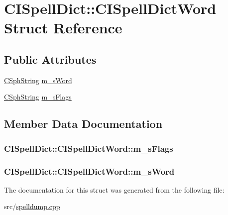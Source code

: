 \hypertarget{structCISpellDict_1_1CISpellDictWord}{\section{C\-I\-Spell\-Dict\-:\-:C\-I\-Spell\-Dict\-Word Struct Reference}
\label{structCISpellDict_1_1CISpellDictWord}
}
\subsection*{Public Attributes}
\begin{DoxyCompactItemize}
\item 
\hyperlink{structCSphString}{C\-Sph\-String} \hyperlink{structCISpellDict_1_1CISpellDictWord_ab806c3f868aa856d7e28c4ff5b277d90}{m\-\_\-s\-Word}
\item 
\hyperlink{structCSphString}{C\-Sph\-String} \hyperlink{structCISpellDict_1_1CISpellDictWord_ad62a81df24d587d5aa64d94a76a2cfe2}{m\-\_\-s\-Flags}
\end{DoxyCompactItemize}


\subsection{Member Data Documentation}
\hypertarget{structCISpellDict_1_1CISpellDictWord_ad62a81df24d587d5aa64d94a76a2cfe2}{
\subsubsection[{m\-\_\-s\-Flags}]{ C\-I\-Spell\-Dict\-::\-C\-I\-Spell\-Dict\-Word\-::m\-\_\-s\-Flags}}\label{structCISpellDict_1_1CISpellDictWord_ad62a81df24d587d5aa64d94a76a2cfe2}
\hypertarget{structCISpellDict_1_1CISpellDictWord_ab806c3f868aa856d7e28c4ff5b277d90}{
\subsubsection[{m\-\_\-s\-Word}]{ C\-I\-Spell\-Dict\-::\-C\-I\-Spell\-Dict\-Word\-::m\-\_\-s\-Word}}\label{structCISpellDict_1_1CISpellDictWord_ab806c3f868aa856d7e28c4ff5b277d90}


The documentation for this struct was generated from the following file\-:\begin{DoxyCompactItemize}
\item 
src/\hyperlink{spelldump_8cpp}{spelldump.\-cpp}\end{DoxyCompactItemize}
